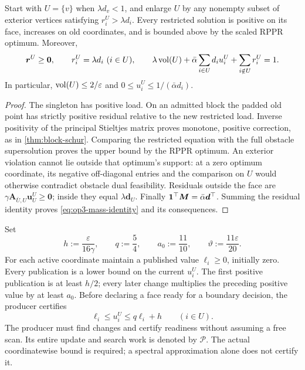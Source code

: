 \begin{lemma}
\label{lem:op3-response-size}
Start with $U=\{v\}$ when $\lambda d_v<1$, and enlarge $U$ by any
nonempty subset of exterior vertices satisfying $r_i^U>\lambda d_i$.
Every restricted solution is positive on its face, increases on old
coordinates, and is bounded above by the scaled RPPR optimum. Moreover,
\begin{equation}
 \bm r^U\geq\bm0,\qquad r_i^U=\lambda d_i\ (i\in U),\qquad
 \lambda\vol(U)+\bar\alpha\sum_{i\in U}d_i u_i^U
       +\sum_{i\notin U}r_i^U=1.
 \label{eq:op3-mass-identity}
\end{equation}
In particular, $\operatorname{vol}(U)\leq2/\varepsilon$ and
$0\leq u_i^U\leq1/(\bar\alpha d_i)$.
\end{lemma}
\begin{proof}
The singleton has positive load. On an admitted block the padded old point
has strictly positive residual relative to the new restricted load. Inverse
positivity of the principal Stieltjes matrix proves monotone, positive
correction, as in \cref{thm:block-schur}. Comparing the restricted equation
with the full obstacle supersolution proves the upper bound by the RPPR
optimum. An exterior violation cannot lie outside that optimum's support:
at a zero optimum coordinate, its negative off-diagonal entries and the
comparison on $U$ would otherwise contradict obstacle dual feasibility.
Residuals outside the face are $\gamma \bm A_{\bar U,U}\bm u_U^U\geq\bm0$;
inside they equal $\lambda\bm d_U$. Finally
$\mathbf{1}^\top \bm M=\bar\alpha\bm d^\top$. Summing the residual identity proves
\cref{eq:op3-mass-identity} and its consequences.
\end{proof}

\begin{definition}
\label{def:op3-publications}
Set
\begin{equation}
 h:=\frac{\varepsilon}{16\gamma},\qquad
 q:=\frac54,\qquad a_0:=\frac{11}{10},\qquad
 \vartheta:=\frac{11\varepsilon}{20}.
 \label{eq:op3-event-constants}
\end{equation}
For each active coordinate maintain a published value $\ell_i\geq0$,
initially zero. Every publication is a lower bound on the current $u_i^U$.
The first positive publication is at least $h/2$; every later change
multiplies the preceding positive value by at least $a_0$. Before declaring
a face ready for a boundary decision, the producer certifies
\begin{equation}
 \ell_i\leq u_i^U\leq q\ell_i+h\qquad(i\in U).
 \label{eq:op3-publication-band}
\end{equation}
The producer must find changes and certify readiness without assuming a
free scan. Its entire update and search work is denoted by $\mathcal P$.
The actual coordinatewise bound is required; a spectral approximation alone
does not certify it.
\end{definition}

